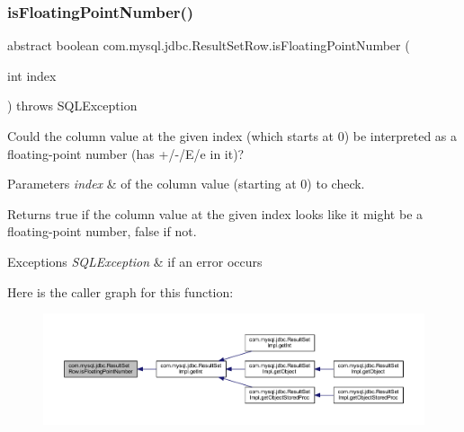 \subsubsection{\texorpdfstring{is\+Floating\+Point\+Number()}{isFloatingPointNumber()}}
{\footnotesize\ttfamily abstract boolean com.\+mysql.\+jdbc.\+Result\+Set\+Row.\+is\+Floating\+Point\+Number (\begin{DoxyParamCaption}\item[{int}]{index }\end{DoxyParamCaption}) throws S\+Q\+L\+Exception\hspace{0.3cm}{\ttfamily [abstract]}}

Could the column value at the given index (which starts at 0) be interpreted as a floating-\/point number (has +/-\//\+E/e in it)?


\begin{DoxyParams}{Parameters}
{\em index} & of the column value (starting at 0) to check.\\
\hline
\end{DoxyParams}
\begin{DoxyReturn}{Returns}
true if the column value at the given index looks like it might be a floating-\/point number, false if not.
\end{DoxyReturn}

\begin{DoxyExceptions}{Exceptions}
{\em S\+Q\+L\+Exception} & if an error occurs \\
\hline
\end{DoxyExceptions}
Here is the caller graph for this function\+:
\nopagebreak
\begin{figure}[H]
\begin{center}
\leavevmode
\includegraphics[width=350pt]{classcom_1_1mysql_1_1jdbc_1_1_result_set_row_abce23203c5142ca0ed2a8f0d031c8123_icgraph}
\end{center}
\end{figure}
\mbox{\label{classcom_1_1mysql_1_1jdbc_1_1_result_set_row_a96243f8e7eb839c4c233a2e4aa1cfb6b}} 
